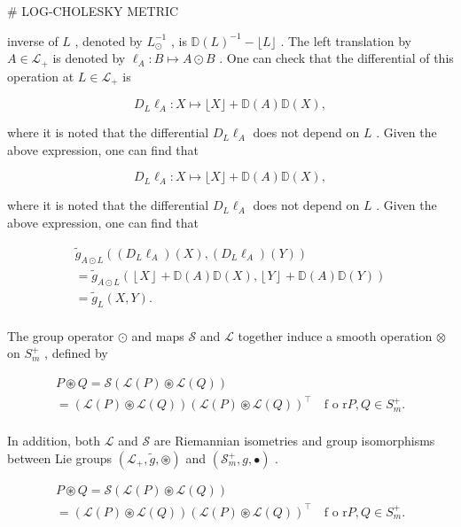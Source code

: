 \documentclass[11pt]{article}
\begin{document}
# LOG-CHOLESKY METRIC

inverse of  $L$ , denoted by  $L_{\odot}^{-1}$ , is  $\mathbb{D}(L)^{-1} - \lfloor L\rfloor$ . The left translation by  $A\in \mathcal{L}_{+}$  is denoted by  $\ell_A:B\mapsto A\odot B$ . One can check that the differential of this operation at  $L\in \mathcal{L}_{+}$  is

$$
D _ {L} \ell_ {A}: X \mapsto \lfloor X \rfloor + \mathbb {D} (A) \mathbb {D} (X), \tag {3.2}
$$

where it is noted that the differential  $D_{L}\ell_{A}$  does not depend on  $L$ . Given the above expression, one can find that

$$
D _ {L} \ell_ {A}: X \mapsto \lfloor X \rfloor + \mathbb {D} (A) \mathbb {D} (X), \tag {3.2}
$$

where it is noted that the differential  $D_{L}\ell_{A}$  does not depend on  $L$ . Given the above expression, one can find that

$$
\begin{array}{l} \tilde {g} _ {A \odot L} ((D _ {L} \ell_ {A}) (X), (D _ {L} \ell_ {A}) (Y)) \\ = \tilde {g} _ {A \odot L} (\left\lfloor X \right\rfloor + \mathbb {D} (A) \mathbb {D} (X), \left\lfloor Y \right\rfloor + \mathbb {D} (A) \mathbb {D} (Y)) \\ = \tilde {g} _ {L} (X, Y). \\ \end{array}
$$

The group operator  $\odot$  and maps  $\mathcal{S}$  and  $\mathcal{L}$  together induce a smooth operation  $\otimes$  on  $S_{m}^{+}$ , defined by

$$
\begin{array}{l} P \circledast Q = \mathcal {S} (\mathcal {L} (P) \circledast \mathcal {L} (Q)) \\ = \left(\mathcal {L} (P) \circledast \mathcal {L} (Q)\right) \left(\mathcal {L} (P) \circledast \mathcal {L} (Q)\right) ^ {\top} \quad \text {f o r} P, Q \in S _ {m} ^ {+}. \\ \end{array}
$$

In addition, both  $\mathcal{L}$  and  $\mathcal{S}$  are Riemannian isometries and group isomorphisms between Lie groups  $(\mathcal{L}_{+},\tilde{g},\circledast)$  and  $(\mathcal{S}_m^+,g,\bullet)$ .

$$
\begin{array}{l} P \circledast Q = \mathcal {S} (\mathcal {L} (P) \circledast \mathcal {L} (Q)) \\ = \left(\mathcal {L} (P) \circledast \mathcal {L} (Q)\right) \left(\mathcal {L} (P) \circledast \mathcal {L} (Q)\right) ^ {\top} \quad \text {f o r} P, Q \in S _ {m} ^ {+}. \\ \end{array}
$$
\end{document}
